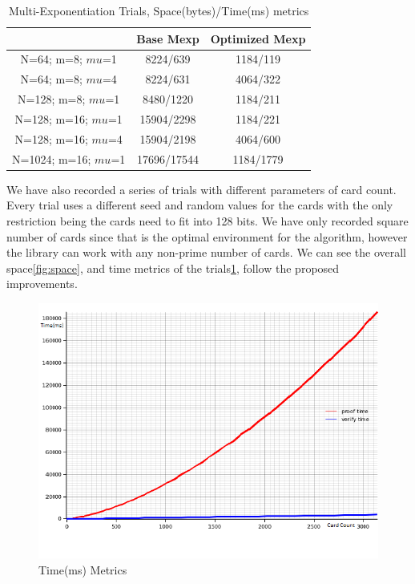 \documentclass[12pt,a4paper]{report}
\begin{document}
\begin{table}
	\begin{center}
	\begin{tabular}{||c|c|c||}\hline
		\backslashbox{Parameters}{Proof Type} & Base Mexp& Optimized Mexp\\
		\hline
		N=64; m=8; $mu$=1 & 8224/639 & 1184/119\\
		\hline
		N=64; m=8; $mu$=4 & 8224/631 & 4064/322 \\
		\hline
		N=128; m=8; $mu$=1 & 8480/1220 & 1184/211\\
		\hline
		N=128; m=16; $mu$=1 & 15904/2298 & 1184/221\\
		\hline
		N=128; m=16; $mu$=4 & 15904/2198 & 4064/600\\
		\hline
		N=1024; m=16; $mu$=1 & 17696/17544 & 1184/1779\\
		\hline
	\end{tabular}
	\end{center}
	\caption{Multi-Exponentiation Trials, Space(bytes)/Time(ms) metrics}
	\label{table:mexp}
\end{table}

We have also recorded a series of trials with different parameters of card count.
Every trial uses a different seed and random values for the cards with the only restriction being the cards need to fit into 128 bits.
We have only recorded square number of cards since that is the optimal environment for the algorithm, however the library can work with any non-prime number of cards.
We can see the overall space\ref{fig:space}, and time metrics of the trials\ref{fig:time}, follow the proposed improvements.

\begin{figure}[h]
	\includegraphics[scale=0.8]{time}
	\caption{Time(ms) Metrics}
	\label{fig:time}
\end{figure}
\end{document}
